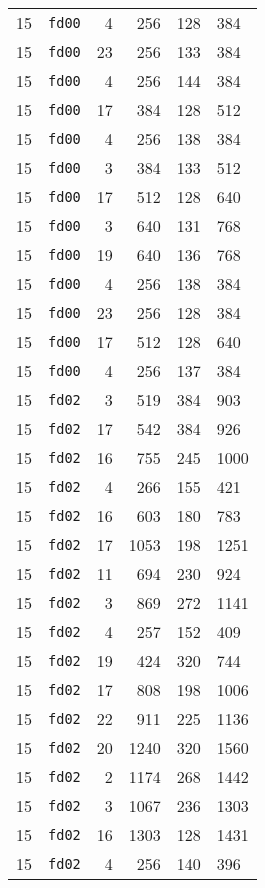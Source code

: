 \documentclass{article}
\begin{document}
\begin{table}[h!]
\begin{tabular}{llrrrl}
    15 & \texttt{fd00} & 4 & 256 & 128 & 384 \\
    15 & \texttt{fd00} & 23 & 256 & 133 & 384 \\
    15 & \texttt{fd00} & 4 & 256 & 144 & 384 \\
    15 & \texttt{fd00} & 17 & 384 & 128 & 512 \\
    15 & \texttt{fd00} & 4 & 256 & 138 & 384 \\
    15 & \texttt{fd00} & 3 & 384 & 133 & 512 \\
    15 & \texttt{fd00} & 17 & 512 & 128 & 640 \\
    15 & \texttt{fd00} & 3 & 640 & 131 & 768 \\
    15 & \texttt{fd00} & 19 & 640 & 136 & 768 \\
    15 & \texttt{fd00} & 4 & 256 & 138 & 384 \\
    15 & \texttt{fd00} & 23 & 256 & 128 & 384 \\
    15 & \texttt{fd00} & 17 & 512 & 128 & 640 \\
    15 & \texttt{fd00} & 4 & 256 & 137 & 384 \\
    15 & \texttt{fd02} & 3 & 519 & 384 & 903 \\
    15 & \texttt{fd02} & 17 & 542 & 384 & 926 \\
    15 & \texttt{fd02} & 16 & 755 & 245 & 1000 \\
    15 & \texttt{fd02} & 4 & 266 & 155 & 421 \\
    15 & \texttt{fd02} & 16 & 603 & 180 & 783 \\
    15 & \texttt{fd02} & 17 & 1053 & 198 & 1251 \\
    15 & \texttt{fd02} & 11 & 694 & 230 & 924 \\
    15 & \texttt{fd02} & 3 & 869 & 272 & 1141 \\
    15 & \texttt{fd02} & 4 & 257 & 152 & 409 \\
    15 & \texttt{fd02} & 19 & 424 & 320 & 744 \\
    15 & \texttt{fd02} & 17 & 808 & 198 & 1006 \\
    15 & \texttt{fd02} & 22 & 911 & 225 & 1136 \\
    15 & \texttt{fd02} & 20 & 1240 & 320 & 1560 \\
    15 & \texttt{fd02} & 2 & 1174 & 268 & 1442 \\
    15 & \texttt{fd02} & 3 & 1067 & 236 & 1303 \\
    15 & \texttt{fd02} & 16 & 1303 & 128 & 1431 \\
    15 & \texttt{fd02} & 4 & 256 & 140 & 396 \\

\end{tabular}
\end{table}
\end{document}
